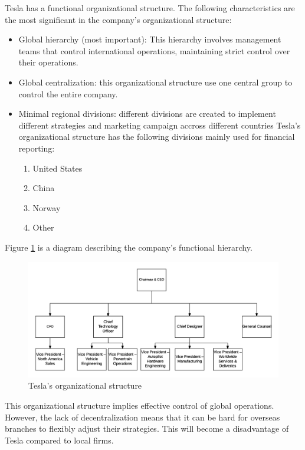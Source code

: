 \documentclass[12pt]{article}
\begin{document}
Tesla has a functional organizational structure. The following characteristics are the most significant in the company's organizational structure:

\begin{itemize}
	\item{Global hierarchy (most important): This hierarchy involves management teams that control international operations, maintaining strict control over their operations.}
	\item{Global centralization: this organizational structure use one central group to control the entire company.}
	\item{Minimal regional divisions: different divisions are created to implement different strategies and marketing campaign accross different countries Tesla’s organizational structure has the following divisions mainly used for financial reporting:
	\begin{enumerate}
		\item{United States}
		\item{China}
		\item{Norway}
		\item{Other}
	\end{enumerate}
	}
\end{itemize}

Figure \ref{structpic} is a diagram describing the company's functional hierarchy.

\begin{figure}
	\includegraphics[width=\textwidth]{TeslaStruct.png}
	\caption{Tesla's organizational structure\label{structpic}}
\end{figure}

This organizational structure implies effective control of global operations. However, the lack of decentralization means that it can be hard for overseas branches to flexibly adjust their strategies. This will become a disadvantage of Tesla compared to local firms.
\end{document}
